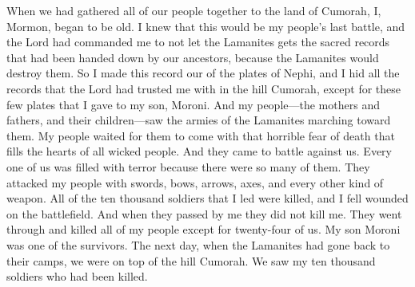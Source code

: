 When we had gathered all of our people together to the land of Cumorah, I, Mormon, began to be old. I knew that this would be my people's last battle, and the Lord had commanded me to not let the Lamanites gets the sacred records that had been handed down by our ancestors, because the Lamanites would destroy them. So I made this record our of the plates of Nephi, and I hid all the records that the Lord had trusted me with in the hill Cumorah, except for these few plates that I gave to my son, Moroni.
\bverse \iffalse And it came to pass that my people, with their wives and their children, did now behold the armies of the Lamanites marching towards them; and with that awful fear of death which fills the breasts of all the wicked, did they await to receive them. \fi
And my people---the mothers and fathers, and their children---saw the armies of the Lamanites marching toward them. My people waited for them to come with that horrible fear of death that fills the hearts of all wicked people.
\bverse \iffalse And it came to pass that they came to battle against us, and every soul was filled with terror because of the greatness of their numbers. \fi
And they came to battle against us. Every one of us was filled with terror because there were so many of them.
\bverse \iffalse And it came to pass that they did fall upon my people with the sword, and with the bow, and with the arrow, and with the ax, and with all manner of weapons of war. \fi
They attacked my people with swords, bows, arrows, axes, and every other kind of weapon.
\bverse \iffalse And it came to pass that my men were hewn down, yea, even my ten thousand who were with me, and I fell wounded in the midst; and they passed by me that they did not put an end to my life. \fi
All of the ten thousand soldiers that I led were killed, and I fell wounded on the battlefield. And when they passed by me they did not kill me.
\bverse \iffalse And when they had gone through and hewn down all my people save it were twenty and four of us, (among whom was my son Moroni) and we having survived the dead of our people, did behold on the morrow, when the Lamanites had returned unto their camps, from the top of the hill Cumorah, the ten thousand of my people who were hewn down, being led in the front by me. \fi
They went through and killed all of my people except for twenty-four of us. My son Moroni was one of the survivors. The next day, when the Lamanites had gone back to their camps, we were on top of the hill Cumorah. We saw my ten thousand soldiers who had been killed.

